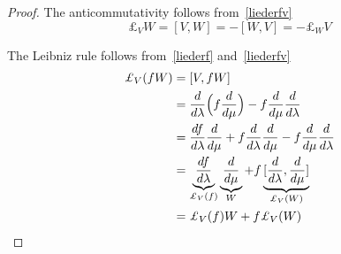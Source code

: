     \begin{proof}
        The anticommutativity follows from~\eqref{liederfv}
        \begin{equation*}
            \pounds_V W = [V, W] = - [W, V] = - \pounds_W V
        \end{equation*}

        The Leibniz rule follows from~\eqref{liederf} and~\eqref{liederfv}
        \begin{equation*}
        \begin{aligned}
            \pounds_V (fW) & = [V, fW] \\ & = \dv{}{\lambda} \Big (f \dv{}{\mu} \Big ) - f \dv{}{\mu} \dv{}{\lambda} \\ & = \dv{f}{\lambda} \dv{}{\mu} + f \dv{}{\lambda} \dv{}{\mu} - f \dv{}{\mu} \dv{}{\lambda} \\ & = \underbrace{\dv{f}{\lambda}}_{\pounds_V (f)} \underbrace{\dv{}{\mu}}_{W} + f \underbrace{[\dv{}{\lambda}, \dv{}{\mu}]}_{\pounds_V (W)} \\ & = \pounds_V (f) W + f \pounds_V (W)
        \end{aligned}
        \end{equation*}


\end{proof}
